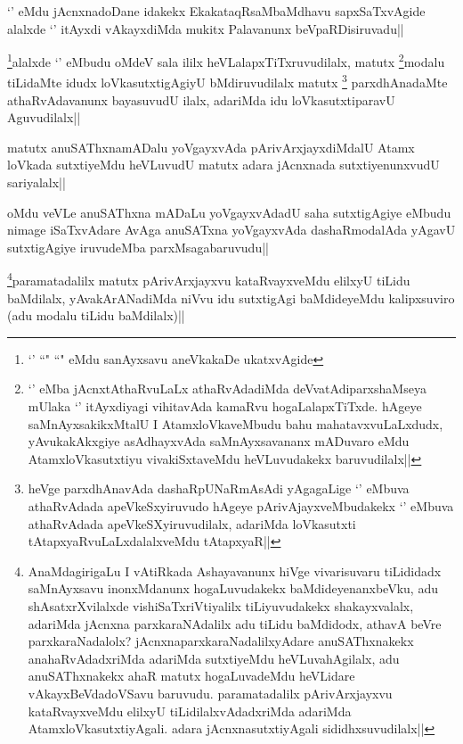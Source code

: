 \begin{artha}
`\stext' eMdu jAcnxnadoDane idakekx EkakataqRsaMbaMdhavu sapxSaTxvAgide alalxde `\stext' itAyxdi vAkayxdiMda mukitx Palavanunx beVpaRDisiruvadu||
\end{artha}

\begin{artha}
\footnote{`\stext' ``\stext" ``\stext" eMdu sanAyxsavu aneVkakaDe ukatxvAgide}alalxde `\stext' eMbudu oMdeV sala ililx heVLalapxTiTxruvudilalx, matutx \footnote{`\stext' eMba jAcnxtAthaRvuLaLx athaRvAdadiMda deVvatAdiparxshaMseya mUlaka `\stext' itAyxdiyagi vihitavAda kamaRvu hogaLalapxTiTxde. hAgeye saMnAyxsakikxMtalU I AtamxloVkaveMbudu bahu mahatavxvuLaLxdudx, yAvukakAkxgiye asAdhayxvAda saMnAyxsavananx mADuvaro eMdu AtamxloVkasutxtiyu vivakiSxtaveMdu heVLuvudakekx baruvudilalx||}modalu tiLidaMte idudx loVkasutxtigAgiyU bMdiruvudilalx matutx \footnote{heVge parxdhAnavAda dashaRpUNaRmAsAdi yAgagaLige `\stext' eMbuva athaRvAdada apeVkeSxyiruvudo hAgeye pArivAjayxveMbudakekx `\stext' eMbuva athaRvAdada apeVkeSXyiruvudilalx, adariMda loVkasutxti tAtapxyaRvuLaLxdalalxveMdu tAtapxyaR||} parxdhAnadaMte athaRvAdavanunx bayasuvudU ilalx, adariMda idu loVkasutxtiparavU Aguvudilalx||
\end{artha}

\begin{artha}
matutx anuSAThxnamADalu yoVgayxvAda pArivArxjayxdiMdalU Atamx loVkada sutxtiyeMdu heVLuvudU matutx adara jAcnxnada sutxtiyenunxvudU sariyalalx||
\end{artha}

\begin{artha}
oMdu veVLe anuSAThxna mADaLu yoVgayxvAdadU saha sutxtigAgiye eMbudu nimage iSaTxvAdare AvAga anuSATxna yoVgayxvAda dashaRmodalAda yAgavU sutxtigAgiye iruvudeMba parxMsagabaruvudu||
\end{artha}


\begin{artha}
\footnote{AnaMdagirigaLu I vAtiRkada Ashayavanunx hiVge vivarisuvaru tiLididadx saMnAyxsavu inonxMdanunx hogaLuvudakekx baMdideyenanxbeVku, adu shAsatxrXvilalxde vishiSaTxriVtiyalilx tiLiyuvudakekx shakayxvalalx, adariMda jAcnxna parxkaraNAdalilx adu tiLidu baMdidodx, athavA beVre parxkaraNadalolx? jAcnxnaparxkaraNadalilxyAdare anuSAThxnakekx anahaRvAdadxriMda adariMda sutxtiyeMdu heVLuvahAgilalx, adu anuSAThxnakekx ahaR matutx hogaLuvadeMdu heVLidare vAkayxBeVdadoVSavu baruvudu. paramatadalilx pArivArxjayxvu kataRvayxveMdu elilxyU tiLidilalxvAdadxriMda adariMda AtamxloVkasutxtiyAgali. adara jAcnxnasutxtiyAgali sididhxsuvudilalx||}paramatadalilx matutx pArivArxjayxvu kataRvayxveMdu elilxyU tiLidu baMdilalx, yAvakArANadiMda niVvu idu sutxtigAgi baMdideyeMdu kalipxsuviro (adu modalu tiLidu baMdilalx)||
\end{artha}

